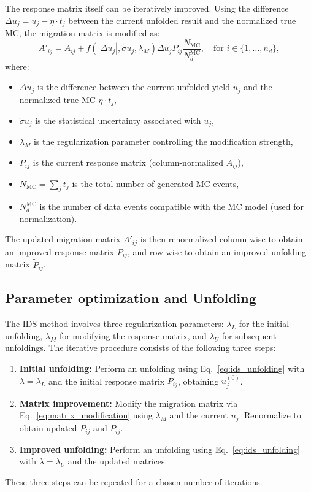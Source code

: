 The response matrix itself can be iteratively improved. Using the difference
$\Delta u_j = u_j - \eta \cdot t_j$ between the current unfolded result and the
normalized true MC, the migration matrix is modified as:
\begin{equation}
    A'_{ij} = A_{ij} + f\left(|\Delta u_j|, \tilde{\sigma} u_j, \lambda_M\right) \Delta u_j P_{ij} \frac{N_{\text{MC}}}{N_d^{\text{MC}}}, \quad \text{for } i \in \{1,\dots,n_d\},
    \label{eq:matrix_modification}
\end{equation}
where:
\begin{itemize}
    \item $\Delta u_j$ is the difference between the current unfolded yield $u_j$ and the normalized true MC $\eta \cdot t_j$,
    \item $\tilde{\sigma} u_j$ is the statistical uncertainty associated with $u_j$,
    \item $\lambda_M$ is the regularization parameter controlling the modification strength,
    \item $P_{ij}$ is the current response matrix (column-normalized $A_{ij}$),
    \item $N_{\text{MC}} = \sum_j t_j$ is the total number of generated MC events,
    \item $N_d^{\text{MC}}$ is the number of data events compatible with the MC model (used for normalization).
\end{itemize}
The updated migration matrix $A'_{ij}$ is then renormalized column-wise to obtain an improved response matrix $P_{ij}$, and row-wise to obtain an improved unfolding matrix $\tilde{P}_{ij}$.


\subsection{Parameter optimization and Unfolding}

The IDS method involves three regularization parameters: $\lambda_L$ for the
initial unfolding, $\lambda_M$ for modifying the response matrix, and
$\lambda_U$ for subsequent unfoldings. The iterative procedure consists of the
following three steps:
\begin{enumerate}
    \item \textbf{Initial unfolding:} Perform an unfolding using Eq.~\eqref{eq:ids_unfolding} with $\lambda = \lambda_L$ and the initial response matrix $P_{ij}$, obtaining $u_j^{(0)}$.
    \item \textbf{Matrix improvement:} Modify the migration matrix via Eq.~\eqref{eq:matrix_modification} using $\lambda_M$ and the current $u_j$. Renormalize to obtain updated $P_{ij}$ and $\tilde{P}_{ij}$.
    \item \textbf{Improved unfolding:} Perform an unfolding using Eq.~\eqref{eq:ids_unfolding} with $\lambda = \lambda_U$ and the updated matrices.
\end{enumerate}
These three steps can be repeated for a chosen number of iterations.

